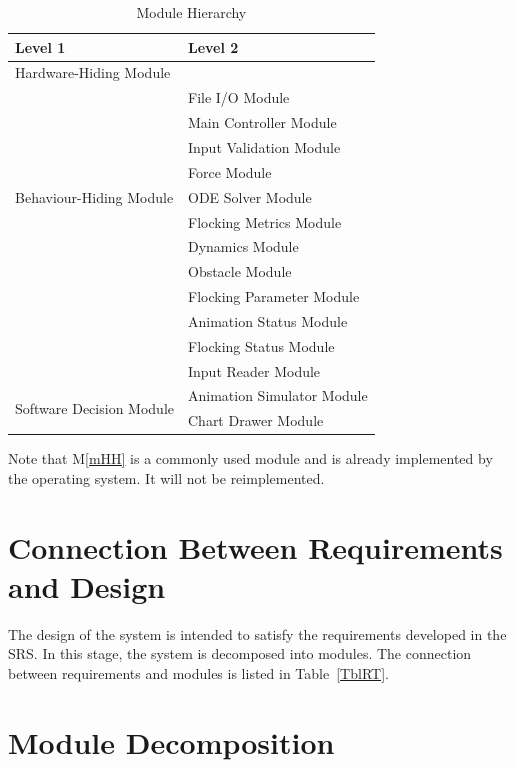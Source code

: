 \documentclass[12pt, titlepage]{article}
\newcommand{\mref}[1]{M\ref{#1}}
\begin{document}
\begin{table}[h!]
\centering
\begin{tabular}{p{} p{}} 
\toprule
\textbf{Level 1} & \textbf{Level 2}\\
\midrule

{Hardware-Hiding Module} & ~ \\ 
& File I/O Module\\
\midrule

\multirow{7}{0.3\textwidth}{Behaviour-Hiding Module}
& Main Controller Module \\
& Input Validation Module\\
& Force Module \\
& ODE Solver Module\\
& Flocking Metrics Module\\
& Dynamics Module \\
& Obstacle Module \\
& Flocking Parameter Module \\
& Animation Status Module \\
& Flocking Status Module \\
& Input Reader Module\\
\midrule

\multirow{3}{0.3\textwidth}{Software Decision Module}
& Animation Simulator Module\\
& Chart Drawer Module\\
\bottomrule

\end{tabular}
\caption{Module Hierarchy}
\label{TblMH}
\end{table}

Note that \mref{mHH} is a commonly used module and is already implemented by 
the operating system. It will not be reimplemented.

\section{Connection Between Requirements and Design} \label{SecConnection}

The design of the system is intended to satisfy the requirements developed in
the SRS. In this stage, the system is decomposed into modules. The connection
between requirements and modules is listed in Table~\ref{TblRT}.

\section{Module Decomposition} \label{SecMD}
\end{document}
